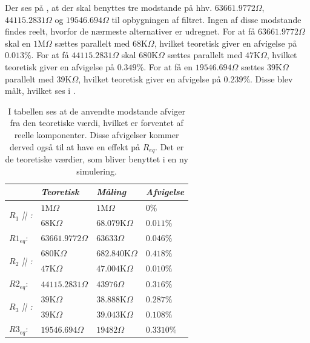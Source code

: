 Der ses på , at der skal benyttes tre modstande på hhv. $63661.9772\Omega$, $44115.2831\Omega$ og $19546.694\Omega$ til opbygningen af filtret. Ingen af disse modstande findes reelt, hvorfor de nærmeste alternativer er udregnet. For at få $63661.9772\Omega$ skal en $1$M$\Omega$  sættes parallelt med $68$K$\Omega$, hvilket teoretisk giver en afvigelse på $0.013\%$. For at få $44115.2831\Omega$ skal $680$K$\Omega$ sættes parallelt med $47$K$\Omega$, hvilket teoretisk giver en afvigelse på $0.349\%$. For at få en $19546.694\Omega$ sættes $39$K$\Omega$ parallelt med $39$K$\Omega$, hvilket teoretisk giver en afvigelse på $0.239\%$. Disse blev målt, hvilket ses i .
\begin{table}[H]
	\centering
	\begin{tabular}{|l|l|l|l|}
		\cline{2-4} \multicolumn{1}{l|}{}
		\textit{}                                     & \textit{Teoretisk} & \textit{Måling}    & \textit{Afvigelse} \\ \hline
		\multirow{2}{*}{\textit{$R_{1}$ || :}} & $1$M$\Omega$       & $1$M$\Omega$  & $0\%$           \\ \cline{2-4} 
		& $68$K$\Omega$      & $68.079$K$\Omega$ & $0.011\%$           \\ \hline
		$R1_{eq}$: & $63661.9772\Omega$ & $63633\Omega$ &  $0.046\%$ \\ \hline
		\multirow{2}{*}{\textit{$R_{2}$ || :}} & $680$K$\Omega$     & $682.840$K$\Omega$  & $0.418\%$        \\ \cline{2-4} 
		& $47$K$\Omega$      & $47.004$K$\Omega$ & $0.010\%$           \\ \hline
		$R2_{eq}$: & $44115.2831\Omega$ & $43976\Omega$ & $0.316\%$ \\ \hline
		\multirow{2}{*}{\textit{$R_{3}$ || :}} & $39$K$\Omega$      & $38.888$K$\Omega$    & $0.287\%$           \\ \cline{2-4} 
		& $39$K$\Omega$     & $39.043$K$\Omega$        & $0.108\%$           \\ \hline
		$R3_{eq}$: & $19546.694\Omega$ & $19482\Omega$  & $0.3310\%$ \\ \hline
	\end{tabular}
	\caption{I tabellen ses at de anvendte modstande afviger fra den teoretiske værdi, hvilket er forventet af reelle komponenter. Disse afvigelser kommer derved også til at have en effekt på $R_{eq}$. Det er de teoretiske værdier, som bliver benyttet i en ny simulering.}
	\label{Tab:Maalingafmodstande_filter}
\end{table}
